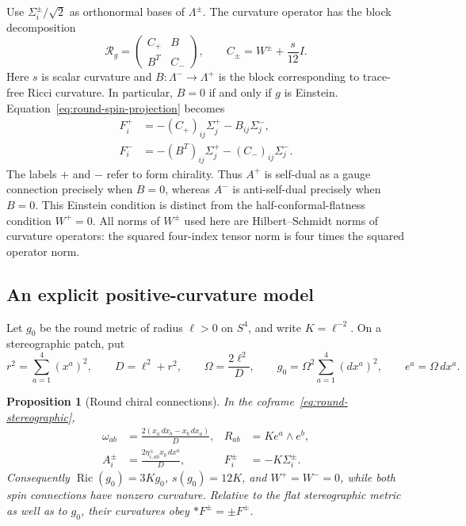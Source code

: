 \documentclass[11pt]{article}
\numberwithin{equation}{section}
\newtheorem{proposition}[theorem]{Proposition}
\theoremstyle{definition}
\theoremstyle{remark}
\begin{document}
Use $\Sigma_i^\pm/\sqrt2$ as orthonormal bases of $\Lambda^\pm$.
The curvature operator has the block decomposition
\begin{equation}
 \mathcal R_g=
 \begin{pmatrix}
 C_+&B\\ B^T&C_-
 \end{pmatrix},
 \qquad C_\pm=W^\pm+\frac{s}{12}I.
 \label{eq:round-curvature-blocks}
\end{equation}
Here $s$ is scalar curvature and $B:\Lambda^-\to\Lambda^+$ is the
block corresponding to trace-free Ricci curvature.  In particular, $B=0$
if and only if $g$ is Einstein.  Equation~\eqref{eq:round-spin-projection}
becomes
\begin{align}
 F_i^+&=-(C_+)_{ij}\Sigma_j^+-B_{ij}\Sigma_j^-,
 \label{eq:round-plus-block}\\
 F_i^-&=-(B^T)_{ij}\Sigma_j^+-(C_-)_{ij}\Sigma_j^-.
 \label{eq:round-minus-block}
\end{align}
The labels $+$ and $-$ refer to form chirality.  Thus $A^+$ is self-dual
as a gauge connection precisely when $B=0$, whereas $A^-$ is anti-self-dual
precisely when $B=0$.  This Einstein condition is distinct from the
half-conformal-flatness condition $W^+=0$.  All norms of $W^\pm$ used here
are Hilbert--Schmidt norms of curvature operators: the squared four-index
tensor norm is four times the squared operator norm.

\subsection{An explicit positive-curvature model}
\label{subsec:round-explicit}

Let $g_0$ be the round metric of radius $\ell>0$ on $S^4$, and write
$K=\ell^{-2}$.  On a stereographic patch, put
\begin{equation}
 r^2=\sum_{a=1}^4(x^a)^2,\qquad
 D=\ell^2+r^2,\qquad
 \Omega=\frac{2\ell^2}{D},\qquad
 g_0=\Omega^2\sum_{a=1}^4(dx^a)^2,
 \qquad e^a=\Omega\,dx^a.
 \label{eq:round-stereographic}
\end{equation}

\begin{proposition}[Round chiral connections]
\label{prop:round-chiral-connections}
In the coframe~\eqref{eq:round-stereographic},
\begin{align}
 \omega_{ab}&=\frac{2(x_a\,dx_b-x_b\,dx_a)}{D},
 &R_{ab}&=K e^a\wedge e^b,
 \label{eq:round-omega-curvature}\\
 A_i^\pm&=\frac{2\eta^\pm_{i,ab}x_b\,dx^a}{D},
 &F_i^\pm&=-K\Sigma_i^\pm.
 \label{eq:round-A-F}
\end{align}
Consequently $\operatorname{Ric}(g_0)=3K g_0$, $s(g_0)=12K$, and
$W^+=W^-=0$, while both spin connections have nonzero curvature.  Relative
to the flat stereographic metric as well as to $g_0$, their curvatures obey
$*F^\pm=\pm F^\pm$.
\end{proposition}
\end{document}
